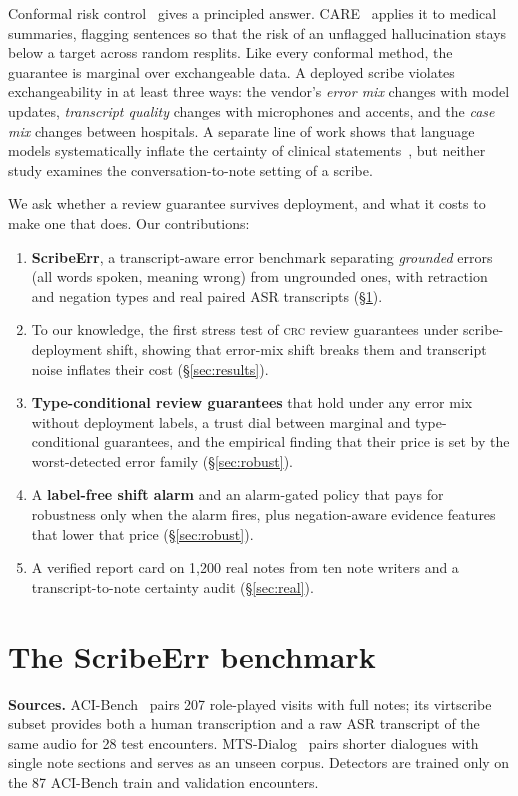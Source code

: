 \documentclass[10pt,twocolumn]{article}
\newcommand{\crc}{\textsc{crc}}
\begin{document}
Conformal risk control~\citep{angelopoulos2022crc} gives a principled answer. CARE~\citep{bedi2026care} applies it to medical summaries, flagging sentences so that the risk of an unflagged hallucination stays below a target across random resplits. Like every conformal method, the guarantee is marginal over exchangeable data. A deployed scribe violates exchangeability in at least three ways: the vendor's \emph{error mix} changes with model updates, \emph{transcript quality} changes with microphones and accents, and the \emph{case mix} changes between hospitals. A separate line of work shows that language models systematically inflate the certainty of clinical statements~\citep{du2026possible,belem2026may}, but neither study examines the conversation-to-note setting of a scribe.

We ask whether a review guarantee survives deployment, and what it costs to make one that does. Our contributions:
\begin{enumerate}
\item \textbf{ScribeErr}, a transcript-aware error benchmark separating \emph{grounded} errors (all words spoken, meaning wrong) from ungrounded ones, with retraction and negation types and real paired ASR transcripts (\S\ref{sec:bench}).
\item To our knowledge, the first stress test of \crc{} review guarantees under scribe-deployment shift, showing that error-mix shift breaks them and transcript noise inflates their cost (\S\ref{sec:results}).
\item \textbf{Type-conditional review guarantees} that hold under any error mix without deployment labels, a trust dial between marginal and type-conditional guarantees, and the empirical finding that their price is set by the worst-detected error family (\S\ref{sec:robust}).
\item A \textbf{label-free shift alarm} and an alarm-gated policy that pays for robustness only when the alarm fires, plus negation-aware evidence features that lower that price (\S\ref{sec:robust}).
\item A verified report card on 1,200 real notes from ten note writers and a transcript-to-note certainty audit (\S\ref{sec:real}).
\end{enumerate}

\section{The ScribeErr benchmark}\label{sec:bench}
\textbf{Sources.} ACI-Bench~\citep{yim2023aci} pairs 207 role-played visits with full notes; its virtscribe subset provides both a human transcription and a raw ASR transcript of the same audio for 28 test encounters. MTS-Dialog~\citep{benabacha2023mts} pairs shorter dialogues with single note sections and serves as an unseen corpus. Detectors are trained only on the 87 ACI-Bench train and validation encounters.
\end{document}
